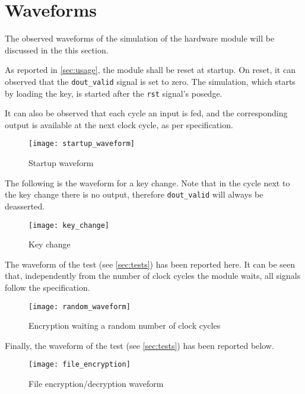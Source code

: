 \section{Waveforms} The observed waveforms of the simulation of the hardware module will be discussed in the this section.

As reported in \cref{sec:usage}, the module shall be reset at startup. On reset, it can observed that the \lstinline{dout_valid} signal is set to zero. The simulation, which starts by loading the key, is started after the \lstinline{rst} signal's posedge.

It can also be observed that each cycle an input is fed, and the corresponding output is available at the next clock cycle, as per specification.
\begin{figure}[!ht]
    \centering
    \texttt{[image: startup\_waveform]}
    \caption{Startup waveform}
    \label{fig:startup_waveform}
\end{figure}

The following is the waveform for a key change. Note that in the cycle next to the key change there is no output, therefore \lstinline{dout_valid} will always be deasserted.
\begin{figure}[!ht]
    \centering
    \texttt{[image: key\_change]}
    \caption{Key change}
    \label{fig:key_change}
\end{figure}

The waveform of the  test (see \cref{sec:tests}) has been reported here. It can be seen that, independently from the number of clock cycles the module waits, all signals follow the specification.
\begin{figure}[!ht]
    \centering
    \texttt{[image: random\_waveform]}
    \caption{Encryption waiting a random number of clock cycles}
    \label{fig:random_waveform}
\end{figure}

\clearpage
Finally, the waveform of the  test (see \cref{sec:tests}) has been reported below.
\begin{figure}[!ht]
    \centering
    \texttt{[image: file\_encryption]}
    \caption{File encryption/decryption waveform}
    \label{fig:file_encryption}
\end{figure}